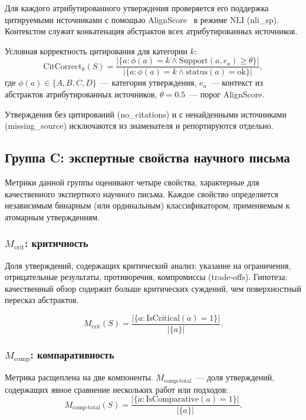 \documentclass[a4paper,14pt]{extarticle}
\begin{document}
Для каждого атрибутированного утверждения проверяется его поддержка цитируемыми источниками с помощью AlignScore~\cite{zha2023alignscore} в режиме NLI (nli\_sp). Контекстом служит конкатенация абстрактов всех атрибутированных источников.

Условная корректность цитирования для категории $k$:
\begin{equation}
    \mathrm{CitCorrect}_k(S) = \frac{|\{a : \phi(a) = k \wedge \mathrm{Support}(a, e_a) \geq \theta\}|}{|\{a : \phi(a) = k \wedge \mathrm{status}(a) = \mathrm{ok}\}|},
\end{equation}
где $\phi(a) \in \{A, B, C, D\}$~--- категория утверждения, $e_a$~--- контекст из абстрактов атрибутированных источников, $\theta = 0.5$~--- порог AlignScore.

Утверждения без цитирований (no\_citations) и с ненайденными источниками (missing\_source) исключаются из знаменателя и репортируются отдельно.


\subsection{Группа C: экспертные свойства научного письма}

Метрики данной группы оценивают четыре свойства, характерные для качественного экспертного научного письма. Каждое свойство определяется независимым бинарным (или ординальным) классификатором, применяемым к атомарным утверждениям.


\subsubsection{$M_\mathrm{crit}$: критичность}

Доля утверждений, содержащих критический анализ: указание на ограничения, отрицательные результаты, противоречия, компромиссы (trade-offs). Гипотеза: качественный обзор содержит больше критических суждений, чем поверхностный пересказ абстрактов.

\begin{equation}
    M_\mathrm{crit}(S) = \frac{|\{a : \mathrm{IsCritical}(a) = 1\}|}{|\{a\}|}.
\end{equation}


\subsubsection{$M_\mathrm{comp}$: компаративность}

Метрика расщеплена на две компоненты. $M_\mathrm{comp\text{-}total}$~--- доля утверждений, содержащих явное сравнение нескольких работ или подходов:
\begin{equation}
    M_\mathrm{comp\text{-}total}(S) = \frac{|\{a : \mathrm{IsComparative}(a) = 1\}|}{|\{a\}|}.
\end{equation}
\end{document}
